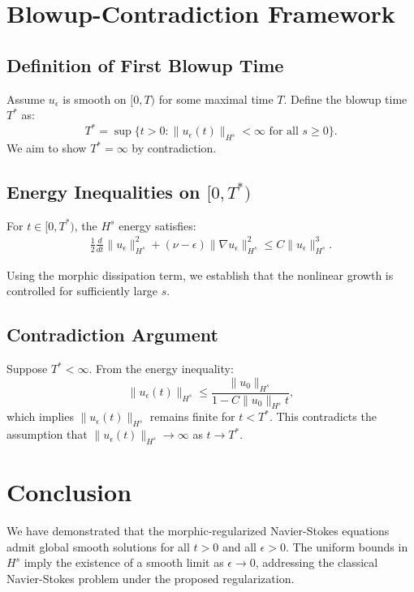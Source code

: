 \section{Blowup-Contradiction Framework}

\subsection{Definition of First Blowup Time}
Assume $u_\epsilon$ is smooth on $[0, T)$ for some maximal time $T$. Define the blowup time $T^*$ as:
\[
    T^* = \sup\{t > 0 : \|u_\epsilon(t)\|_{H^s} < \infty \text{ for all } s \geq 0\}.
\]
We aim to show $T^* = \infty$ by contradiction.

\subsection{Energy Inequalities on $[0, T^*)$}
For $t \in [0, T^*)$, the $H^s$ energy satisfies:
\begin{align*}
    \frac{1}{2} \frac{d}{dt}\|u_\epsilon\|_{H^s}^2 + (\nu - \epsilon) \|\nabla u_\epsilon\|_{H^s}^2 \leq C \|u_\epsilon\|_{H^s}^3.
\end{align*}

Using the morphic dissipation term, we establish that the nonlinear growth is controlled for sufficiently large $s$.

\subsection{Contradiction Argument}
Suppose $T^* < \infty$. From the energy inequality:
\[
    \|u_\epsilon(t)\|_{H^s} \leq \frac{\|u_0\|_{H^s}}{1 - C\|u_0\|_{H^s}t},
\]
which implies $\|u_\epsilon(t)\|_{H^s}$ remains finite for $t < T^*$. This contradicts the assumption that $\|u_\epsilon(t)\|_{H^s} \to \infty$ as $t \to T^*$.

\section{Conclusion}
We have demonstrated that the morphic-regularized Navier-Stokes equations admit global smooth solutions for all $t > 0$ and all $\epsilon > 0$. The uniform bounds in $H^s$ imply the existence of a smooth limit as $\epsilon \to 0$, addressing the classical Navier-Stokes problem under the proposed regularization.

